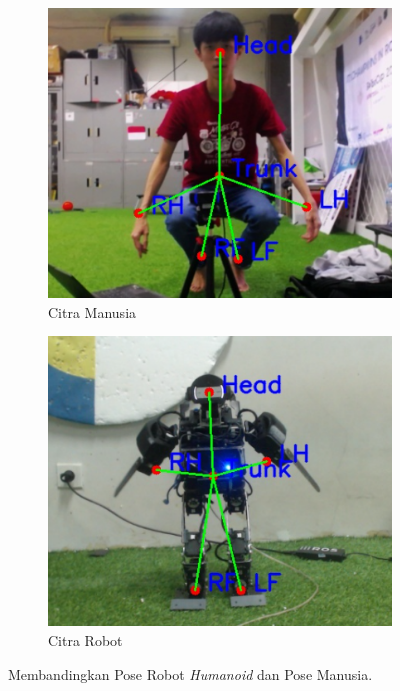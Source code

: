 \begin{figure}
  \centering
  \begin{subfigure}[b]{0.45\textwidth}
      \centering
      \includegraphics[width=\textwidth]{gambar/human_6_result.jpg}
      \caption{Citra Manusia}
      \label{fig:humanimageb}
  \end{subfigure}
  \hfill
  \begin{subfigure}[b]{0.45\textwidth}
      \centering
      \includegraphics[width=\textwidth]{gambar/robot_6_result.jpg}
      \caption{Citra Robot}
      \label{fig:robotimageb}
  \end{subfigure}
     \caption{Membandingkan Pose Robot \textit{Humanoid} dan Pose Manusia.}
     \label{fig:comparingb}
\end{figure}

